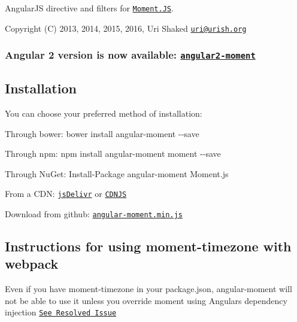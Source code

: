 Angular\+JS directive and filters for \href{http://www.momentjs.com}{\tt Moment.\+JS}.

Copyright (C) 2013, 2014, 2015, 2016, Uri Shaked \href{mailto:uri@urish.org}{\tt uri@urish.\+org}

\href{https://travis-ci.org/urish/angular-moment}{\tt } \href{https://coveralls.io/r/urish/angular-moment}{\tt }

\subsubsection*{Angular 2 version is now available\+: \href{https://github.com/urish/angular2-moment}{\tt angular2-\/moment}}





\subsection*{Installation }

You can choose your preferred method of installation\+:
\begin{DoxyItemize}
\item Through bower\+: {\ttfamily bower install angular-\/moment -\/-\/save}
\item Through npm\+: {\ttfamily npm install angular-\/moment moment -\/-\/save}
\item Through Nu\+Get\+: {\ttfamily Install-\/\+Package angular-\/moment Moment.\+js}
\item From a C\+DN\+: \href{https://cdn.jsdelivr.net/angular.moment/1.0.0/angular-moment.min.js}{\tt js\+Delivr} or \href{https://cdnjs.cloudflare.com/ajax/libs/angular-moment/1.0.0/angular-moment.min.js}{\tt C\+D\+N\+JS}
\item Download from github\+: \href{https://raw.github.com/urish/angular-moment/master/angular-moment.min.js}{\tt angular-\/moment.\+min.\+js}
\end{DoxyItemize}

\subsection*{Instructions for using moment-\/timezone with webpack }

Even if you have {\ttfamily moment-\/timezone} in your {\ttfamily package.\+json}, {\ttfamily angular-\/moment} will not be able to use it unless you override moment using Angular\textquotesingle{}s dependency injection \href{https://github.com/urish/angular-moment/pull/234}{\tt See Resolved Issue}


